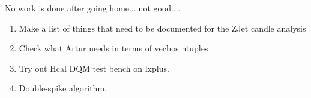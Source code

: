 
No work is done after going home....not good....


\begin{enumerate}
\item Make a list of things that need to be documented for the ZJet candle analysis
\item Check what Artur needs in terms of vecbos ntuples
\item Try out Hcal DQM test bench on lxplus.
\item Double-spike algorithm.
\end{enumerate}



